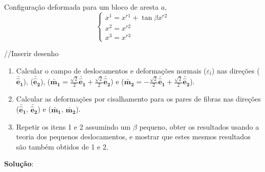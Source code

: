 Configuração deformada para um bloco de aresta $a$,
\[
\begin{cases}
    x^1=x^{r1}+\tan\beta x^{r2} \\ x^2=x^{r2} \\ x^3=x^{r3}
\end{cases}
\]

//Inserir desenho

\begin{enumerate}
    \item Calcular o campo de deslocamentos e deformações normais ($\varepsilon_l$) nas direções ($\utilde{\mathbf{\hat{e}_1}}$), ($\utilde{\mathbf{\hat{e}_2}}$), ($\utilde{\mathbf{m_1}}=\frac{\sqrt{2}}{2}\utilde{\mathbf{\hat{e}_1}}+\frac{\sqrt{2}}{2}\utilde{\mathbf{\hat{e}_2}}$) e ($\utilde{\mathbf{m_2}}=-\frac{\sqrt{2}}{2}\utilde{\mathbf{\hat{e}_1}}+\frac{\sqrt{2}}{2}\utilde{\mathbf{\hat{e}_2}}$).
\item Calcular as deformações por cisalhamento para os pares de fibras nas direções ($\utilde{\mathbf{\hat{e}_1}}$, $\utilde{\mathbf{\hat{e}_2}}$) e ($\utilde{\mathbf{m_1}}$, $\utilde{\mathbf{m_2}}$).
\item Repetir os itens 1 e 2 assumindo um $\beta$ pequeno, obter os resultados usando a teoria dos pequenos deslocamentos, e mostrar que estes mesmos resultados são também obtidos de 1 e 2.
\end{enumerate}

\textbf{Solução}:

